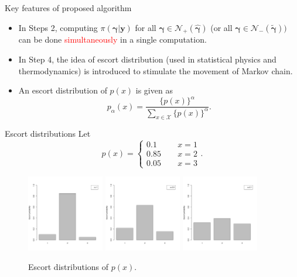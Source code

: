 \documentclass[citecolor=blue,10pt]{beamer}
\def\bg{{\boldsymbol \gamma}}
\newcommand{\0} {\mbox{\boldmath$0$}}
\newcommand{\uy}{{\boldsymbol y}}
\begin{document}
\begin{frame}{Key features of proposed algorithm}
\begin{itemize}\itemsep=5mm
\item In Steps 2, computing $\pi(\bg|\uy)$ for all $\bg  \in \mathcal{N}_+(\hat{\bg} )$ (or all $\bg  \in \mathcal{N}_-(\tilde{\bg} ) )$ can be done \textcolor{red}{simultaneously} in a single computation.
\item In Step 4, the idea of escort distribution (used in statistical physics and thermodynamics) is introduced to stimulate the movement of Markov chain.
\item An escort distribution of $p(x)$ is given as 
$$ p_\alpha(x)=\frac{\{p(x)\}^\alpha}{\sum_{x \in \mathcal{X} } \{p(x)\}^\alpha}.$$

\end{itemize}
\end{frame}
\begin{frame}{Escort distributions}
Let $$p(x)=\begin{cases} 0.1\quad &x=1 \\ 0.85~\quad &x=2 \\0.05~\quad &x=3 \end{cases}.$$
\begin{figure}
\includegraphics[trim=5mm 5mm 0 5mm,width=0.3\textwidth]{escort_fig1.pdf}
\includegraphics[trim=5mm 5mm 0 5mm,width=0.3\textwidth]{escort_fig2.pdf}
\includegraphics[trim=5mm 5mm 0 5mm,width=0.3\textwidth]{escort_fig3.pdf}
\caption{Escort distributions of $p(x)$.}
\end{figure}
\end{frame}
\end{document}
